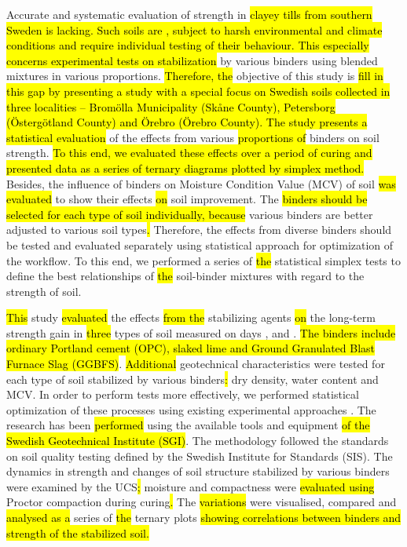 \documentclass[electronics,article,submit,pdftex,moreauthors]{Definitions/mdpi}
\begin{document}
Accurate and systematic evaluation of strength in \hl{clayey tills from southern Sweden is lacking. Such soils are  , subject to harsh environmental and climate conditions and require individual testing of their behaviour. This especially concerns experimental tests on stabilization} by various binders using blended mixtures in various proportions. \hl{Therefore, the} objective of this study is \hl{fill in this gap by presenting a study with a special focus on Swedish soils collected in three localities -- Brom\"olla Municipality (Sk\aa ne County), Petersborg (\"Osterg\"otland County) and \"Orebro (\"Orebro County). The study presents a statistical evaluation} of the effects from various \hl{proportions of} binders\hl{ }on soil strength. \hl{To this end, we evaluated these effects over a period of curing and presented data as a series of ternary diagrams plotted by simplex method.} Besides, the\hl{ }influence of binders on Moisture Condition Value (MCV) of soil \hl{was evaluated} to show their effects \hl{on} soil improvement. The \hl{binders should be selected for each type of soil individually, because} various\hl{ }binders are better adjusted to\hl{ }various soil types\hl{. }Therefore, the effects from diverse binders should be tested and evaluated separately using statistical approach for optimization of the workflow. To this end, we performed a series of \hl{the} statistical simplex tests to define the best relationships of \hl{the} soil-binder mixtures with regard to the strength of soil.

\hl{This }study\hl{ evaluated} the effects \hl{from the} stabilizing agents\hl{ on} the long-term strength gain in \hl{three} types of soil measured on days ,  and . \hl{The binders include ordinary Portland cement (OPC), slaked lime and Ground Granulated Blast Furnace Slag (GGBFS)}. \hl{Additional} geotechnical characteristics were tested for each type of soil stabilized by various binders\hl{: }dry density, water content and MCV. In order to perform tests more effectively, we performed statistical optimization of these processes using existing experimental approaches \cite{Montgomery,MyersMontgomery}. The research has been \hl{performed} using the available tools and equipment \hl{of the Swedish Geotechnical Institute (SGI)}. The methodology followed the\hl{ }standards on soil quality testing defined\hl{ }by the Swedish Institute for Standards (SIS). The dynamics in strength and changes of soil structure stabilized by various binders were examined by the UCS\hl{; }moisture and compactness were \hl{evaluated using} Proctor compaction\hl{ }during curing\hl{. }The\hl{ variations} were visualised, compared and \hl{analysed as a} series of \hl{the} ternary plots\hl{ showing correlations between binders and strength of the stabilized soil.} 
\end{document}
